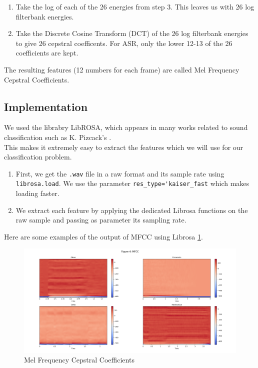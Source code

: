 \documentclass{article} %
\begin{document}
\begin{enumerate}
	  	\item Take the log of each of the 26 energies from step 3. This leaves us with 26 log filterbank energies.

		\item Take the Discrete Cosine Transform (DCT) of the 26 log filterbank energies to give 26 cepstral coefficents. For ASR, only the lower 12-13 of the 26 coefficients are kept.

	\end{enumerate}
	The resulting features (12 numbers for each frame) are called Mel Frequency Cepstral Coefficients.

	\subsection{Implementation}
		We used the librabry LibROSA, which appears in many works related to sound classification such as K. Pizcack's \cite{cite2}.\\
		This makes it extremely easy to extract the features which we will use for our classification problem.

		\begin{enumerate}
			\item First, we get the \verb+.wav+ file in a raw format and its sample rate using \verb+librosa.load+. We use the parameter \verb+res_type='kaiser_fast+ which makes loading faster.
			\item We extract each feature by applying the dedicated Librosa functions on the raw sample and passing as parameter its sampling rate.
		\end{enumerate}
		Here are some examples of the output of MFCC using Librosa \ref{fig:mfccgraph}.
		\begin{figure}[H]
		  \includegraphics[width=\linewidth]{mfcc.png}
		  \caption{Mel Frequency Cepstral Coefficients}
		  \label{fig:mfccgraph}
		\end{figure}
\end{document}
